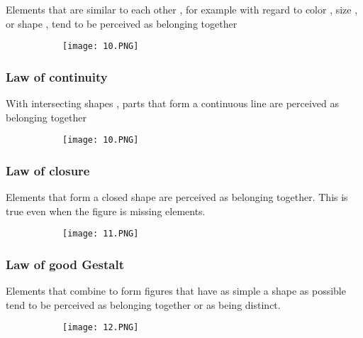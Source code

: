 \documentclass{article}
\begin{document}
Elements that are similar to each other , for example with regard to color , size , or shape , tend to be perceived as belonging together

\begin{figure}[ht!]
  \centering
  \begin{subfigure}[b]{0.5\linewidth}
    \texttt{[image: 10.PNG]}
  \end{subfigure}
\end{figure}

\vspace{20mm}

\subsubsection{Law of continuity}

With intersecting shapes , parts that form a continuous line are perceived as belonging together

\begin{figure}[ht!]
  \centering
  \begin{subfigure}[b]{0.5\linewidth}
    \texttt{[image: 10.PNG]}
  \end{subfigure}
\end{figure}

\subsubsection{Law of closure}

Elements that form a closed shape are perceived as belonging together. This is true even when the figure is missing elements.

\begin{figure}[ht!]
  \centering
  \begin{subfigure}[b]{0.5\linewidth}
    \texttt{[image: 11.PNG]}
  \end{subfigure}
\end{figure}

\subsubsection{Law of good Gestalt}

Elements that combine to form figures that have as simple a shape as possible tend to be perceived as belonging together or as being distinct.

\begin{figure}[ht!]
  \centering
  \begin{subfigure}[b]{0.5\linewidth}
    \texttt{[image: 12.PNG]}
  \end{subfigure}
\end{figure}
\end{document}
